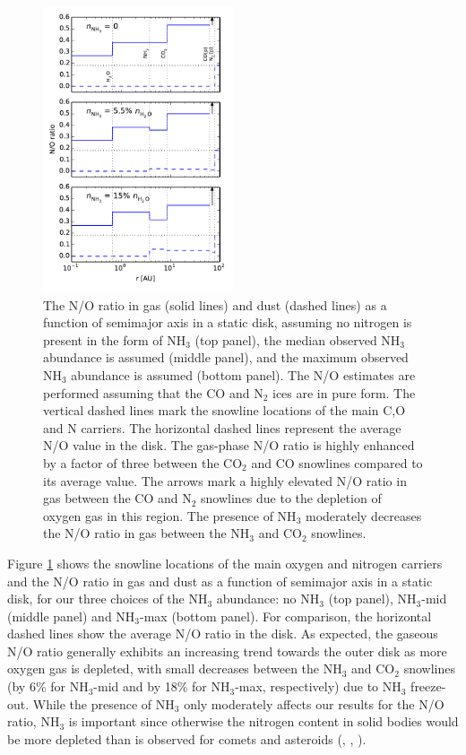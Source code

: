 \documentclass[apj]{emulateapj}
\begin{document}
\begin{figure}[h!]
\centering
\includegraphics[width=0.5\textwidth]{N_O_ratio.pdf}
\caption{The N/O ratio in gas (solid lines) and dust (dashed lines) as a function of semimajor axis in a static disk, assuming no nitrogen is present in the form of NH$_3$ (top panel), the median observed NH$_3$ abundance is assumed (middle panel), and the maximum observed NH$_3$ abundance is assumed (bottom panel). The N/O estimates are performed assuming that the CO and N$_2$ ices are in pure form. The vertical dashed lines mark the snowline locations of the main C,O and N carriers. The horizontal dashed lines represent the average N/O value in the disk. The gas-phase N/O ratio is highly enhanced by a factor of three between the CO$_2$ and CO snowlines compared to its average value. The arrows mark a highly elevated N/O ratio in gas between the CO and N$_2$ snowlines due to the depletion of oxygen gas in this region. The presence of NH$_3$ moderately decreases the N/O ratio in gas between the NH$_3$ and CO$_2$ snowlines.} 
\label{fig:Nstatic}
\end{figure}

Figure \ref{fig:Nstatic} shows the snowline locations of the main oxygen and nitrogen carriers and the N/O ratio in gas and dust as a function of semimajor axis in a static disk, for our three choices of the NH$_3$ abundance: no NH$_3$ (top panel), NH$_3$-mid (middle panel) and NH$_3$-max (bottom panel). For comparison, the horizontal dashed lines show the average N/O ratio in the disk. As expected, the gaseous N/O ratio generally exhibits an increasing trend towards the outer disk as more oxygen gas is depleted, with small decreases between the NH$_3$ and CO$_2$ snowlines (by 6\% for NH$_3$-mid and by 18\% for NH$_3$-max, respectively) due to NH$_3$ freeze-out. While the presence of NH$_3$ only moderately affects our results for the N/O ratio, NH$_3$ is important since otherwise the nitrogen content in solid bodies would be more depleted than is observed for comets and asteroids (\citealt{wyckoff91}, \citealt{mumma11}, \citealt{bergin15}).
\end{document}

